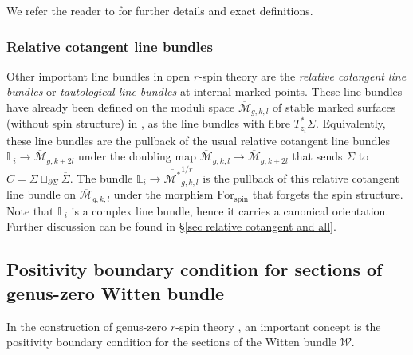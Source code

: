 \documentclass[11pt]{amsart}
\theoremstyle{definition}
\theoremstyle{remark}
\newcommand{\<}{\left<}
\renewcommand{\>}{\right>}
\numberwithin{equation}{section}
\def\Mbar{{\overline{\mathcal M}}}
\def\Mbarstar{{\overline{\mathcal M^*}}}
\begin{document}
We refer the reader to \cite[\S 4.1.3]{BCT2} for further details and exact definitions.

\subsubsection{Relative cotangent line bundles}
Other important line bundles in open $r$-spin theory are the \emph{relative cotangent line bundles} or \emph{tautological line bundles} at internal marked points. These line bundles have already been defined on the moduli space $\Mbar_{g,k,l}$ of stable marked surfaces (without spin structure) %
in \cite{PST14}, as %
the line bundles with fibre $T^*_{z_i}\Sigma$. Equivalently, these line bundles are the pullback of the usual relative cotangent line bundles ${\mathbb{L}}_i\to\Mbar_{g,k+2l}$ under the doubling map $\Mbar_{g,k,l} \to \Mbar_{g,k+2l}$ that sends $\Sigma$ to $C=\Sigma\sqcup_{\partial\Sigma}\overline{\Sigma}$.  The bundle $\mathbb{L}_i\to\Mbarstar_{g,k,l}^{1/r}$ is the pullback of this relative cotangent line bundle on $\Mbar_{g,k,l}$ under the morphism $\text{For}_{\text{spin}}$ that forgets the spin structure.  Note that $\mathbb{L}_i$ is a complex line bundle, hence it carries a canonical orientation. Further discussion can be found %
in \S \ref{sec relative  cotangent and all}.

\subsection{Positivity boundary condition for sections of genus-zero Witten bundle}\label{sec positivity constraint}

In %
the construction of genus-zero $r$-spin theory \cite{BCT2,TZ2}, an important concept is the positivity boundary condition for the sections of the Witten bundle $\mathcal W$.
\end{document}
